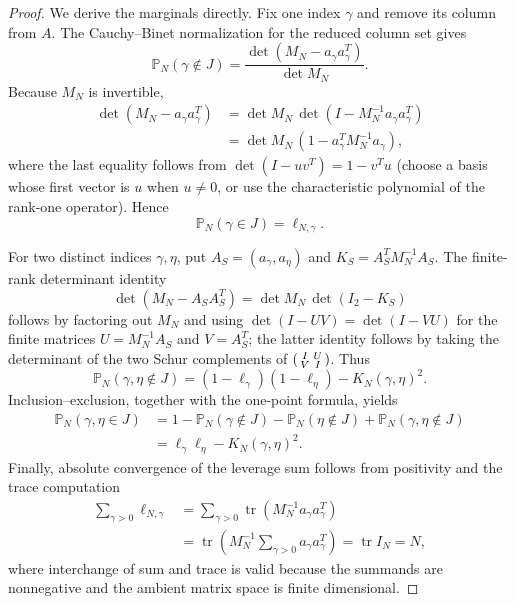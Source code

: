 \documentclass[11pt]{amsart}
\numberwithin{equation}{section}
\theoremstyle{plain}
\theoremstyle{definition}
\theoremstyle{remark}
\begin{document}
\begin{proof}
We derive the marginals directly.  Fix one index $\gamma$ and remove its column from $A$.  The Cauchy--Binet normalization for the reduced column set gives
\begin{equation}
\mathbb P_N(\gamma\notin J)
=\frac{\det(M_N-a_\gamma a_\gamma^T)}{\det M_N}.
\end{equation}
Because $M_N$ is invertible,
\begin{align}
\det(M_N-a_\gamma a_\gamma^T)
&=\det M_N\,\det(I-M_N^{-1}a_\gamma a_\gamma^T)\\
&=\det M_N\,(1-a_\gamma^TM_N^{-1}a_\gamma),
\end{align}
where the last equality follows from $\det(I-uv^T)=1-v^Tu$ (choose a basis whose first vector is $u$ when $u\ne0$, or use the characteristic polynomial of the rank-one operator).  Hence
\begin{equation}
\mathbb P_N(\gamma\in J)=\ell_{N,\gamma}.
\end{equation}

For two distinct indices $\gamma,\eta$, put $A_S=(a_\gamma,a_\eta)$ and
$K_S=A_S^TM_N^{-1}A_S$.  The finite-rank determinant identity
\begin{equation}
\det(M_N-A_SA_S^T)=\det M_N\,\det(I_2-K_S)
\end{equation}
follows by factoring out $M_N$ and using $\det(I-UV)=\det(I-VU)$ for the finite matrices $U=M_N^{-1}A_S$ and $V=A_S^T$; the latter identity follows by taking the determinant of the two Schur complements of
$\begin{psmallmatrix}I&U\\V&I\end{psmallmatrix}$.  Thus
\begin{equation}
\mathbb P_N(\gamma,\eta\notin J)
=(1-\ell_\gamma)(1-\ell_\eta)-K_N(\gamma,\eta)^2.
\end{equation}
Inclusion--exclusion, together with the one-point formula, yields
\begin{align}
\mathbb P_N(\gamma,\eta\in J)
&=1-\mathbb P_N(\gamma\notin J)-\mathbb P_N(\eta\notin J)
+\mathbb P_N(\gamma,\eta\notin J)\\
&=\ell_\gamma\ell_\eta-K_N(\gamma,\eta)^2.
\end{align}
Finally, absolute convergence of the leverage sum follows from positivity and the trace computation
\begin{align}
\sum_{\gamma>0}\ell_{N,\gamma}
&=\sum_{\gamma>0}\operatorname{tr}(M_N^{-1}a_\gamma a_\gamma^T)\\
&=\operatorname{tr}\left(M_N^{-1}\sum_{\gamma>0}a_\gamma a_\gamma^T\right)
=\operatorname{tr}I_N=N,
\end{align}
where interchange of sum and trace is valid because the summands are nonnegative and the ambient matrix space is finite dimensional.
\end{proof}
\end{document}
